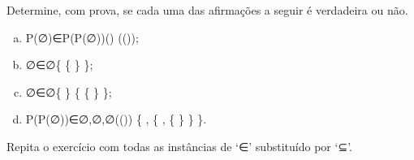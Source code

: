 \begin{exercise}
Determine, com prova, se cada uma das afirmações a seguir é verdadeira ou não.
\begin{enumerate}[(a)]
\item P(∅)∈P(P(∅))(\varnothing) \in {}((\varnothing));
\item ∅∈{{∅}}\varnothing \in \{ \{ \varnothing \} \};
\item {∅}∈{{∅}}\{ \varnothing \} \in \{ \{ \varnothing \} \};
\item P(P(∅))∈{∅,{∅,{∅}}}((\varnothing)) \in \{ \varnothing, \{ \varnothing, \{ \varnothing \} \} \}.
\end{enumerate}
Repita o exercício com todas as instâncias de `∈\in' substituído por `⊆\subseteq'.
\end{exercise}

